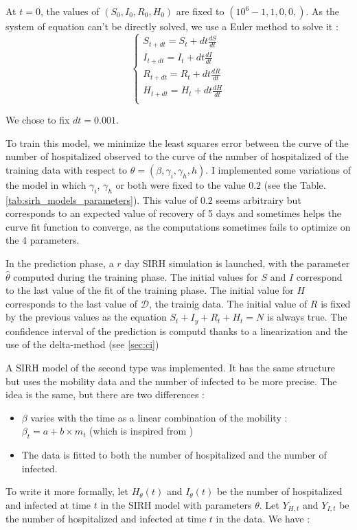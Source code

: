 At $t=0$, the values of $(S_0, I_0, R_0, H_0)$ are fixed to $(10^6 -1, 1, 0, 0,) $. 
As the system of equation can't be directly solved, we use a Euler method to solve it : \\


\begin{equation}
    \left\{
    \begin{aligned}
        S_{t+dt}=S_t + dt \frac{dS}{dt}\\
        I_{t+dt}=I_t + dt \frac{dI}{dt}\\
        R_{t+dt}=R_t + dt \frac{dR}{dt}\\
        H_{t+dt}=H_t + dt \frac{dH}{dt}\\
    \end{aligned}
    \right.
\end{equation}


We chose to fix $dt=0.001$. 


To train this model, we minimize the least squares error between the curve of the number of hospitalized observed to the curve of the number of hospitalized of the training data with respect to $\theta = (\beta, \gamma_i, \gamma_h, h)$. 
I implemented some variations of the model in which $\gamma_i$, $\gamma_h$ or both were fixed to the value $0.2$ (see the Table.\ref{tab:sirh_models_parameters}).
This value of $0.2$ seems arbitrairy but corresponds to an expected value of recovery of 5 days and sometimes helps the curve fit function to converge, as the computations sometimes fails to optimize on the 4 parameters. 


In the prediction phase, a $r$ day SIRH simulation is launched, with the parameter $\hat{\theta}$ computed during the training phase. 
The initial values for $S$ and $I$ correspond to the last value of the fit of the training phase. 
The initial value for $H$ corresponds to the last value of $\mathcal{D}$, the trainig data. 
The initial value of $R$ is fixed by the previous values as the equation $S_t + I_y + R_t + H_t = N$ is always true. 
The confidence interval of the prediction is computd thanks to a linearization and the use of the delta-method (see \ref{sec:ci})

A SIRH model of the second type was implemented. 
It has the same structure but uses the mobility data and the number of infected to be more precise. 
The idea is the same, but there are two differences : 
\begin{itemize}
    \item $\beta$ varies with the time as a linear combination of the mobility : $\beta_t = a + b \times m_t$ (which is inspired from \cite{gerlee2021predicting})
    \item The data is fitted to both the number of hospitalized and the number of infected. 
\end{itemize}
To write it more formally, let $H_\theta(t)$ and $I_\theta(t)$ be the number of hospitalized and infected at time $t$ in the SIRH model with parameters $\theta$.
Let $Y_{H, t}$ and $Y_{I, t}$ be the number of hospitalized and infected at time $t$ in the data.
We have :\\

